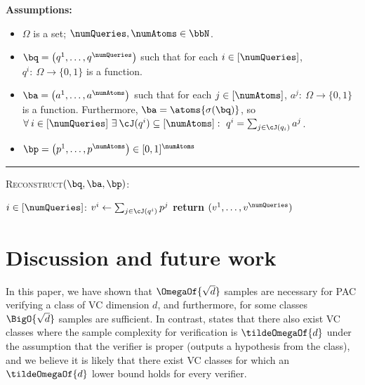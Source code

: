 \documentclass{toc}
\begin{document}
\begin{protocol}[H]
	\begin{ShadedAlgorithmBox}
		{\bfseries Assumptions:}
		\begin{itemize}
			\item{$\Omega$ is a set; $\numQueries,\numAtoms \in \bbN$.}
			\item{
				$\bq = \left(q^1,\dots,q^{\numQueries}\right)$ such that for each $i \in [\numQueries]$, $q^i:\: \Omega \to \{0,1\}$ is a function.
			}
			\item{
				$\ba = \left(a^1,\dots,a^{\numAtoms}\right)$ such that for each $j \in [\numAtoms]$, $a^j:\: \Omega \to \{0,1\}$ is a function. Furthermore,
				$\ba = \atoms{\sigma(\bq)}$, so $\forall \: i \in [\numQueries]~ \exists \: \cJ(q^i) \subseteq [\numAtoms]: ~ q^i = \sum_{j \in \cJ(q_i)} a^j$.
			}
			\item{
				$\bp = \left(p^1,\dots,p^{\numAtoms}\right) \in [0,1]^{\numAtoms}$
			}
		\end{itemize}
		
		\noindent\rule{\textwidth}{0.5pt}
		
		\vspace*{0.5em}
		
		\textsc{Reconstruct}$(\bq,\ba,\bp)$:
		\begin{algorithmic}
			\For $i \in [\numQueries]$:
				\State $v^i \gets \sum_{j \in \cJ(q^i)} p^j$
			\EndFor
			\State \textbf{return} $(v^1,\dots,v^{\numQueries})$
		\end{algorithmic}
		
	\end{ShadedAlgorithmBox}
	\caption{A subroutine of \cref{protocol:sq-verifier-iteration}. Compute the evaluations for a collection of statistical queries $\bq$ with atoms $\ba$ given evaluations $\bp$ for the atoms.}
	\label{protocol:sq-reconstruct-valuations}
\end{protocol}

\section{Discussion and future work}

In this paper, we have shown that $\OmegaOf{\sqrt{d}}$ samples are necessary for PAC verifying a class of VC dimension $d$, and furthermore, for some classes $\BigO{\sqrt{d}}$ samples are sufficient. In contrast, %
\cite[Lemma 4.1]{GoldwasserRSY21}  %
states that there also exist VC classes where the sample complexity for verification
is $\tildeOmegaOf{d}$ under the assumption that the verifier is proper (outputs a hypothesis from the class), and we believe it is likely that there exist VC classes for which an $\tildeOmegaOf{d}$ lower bound holds for every verifier. 
\end{document}
